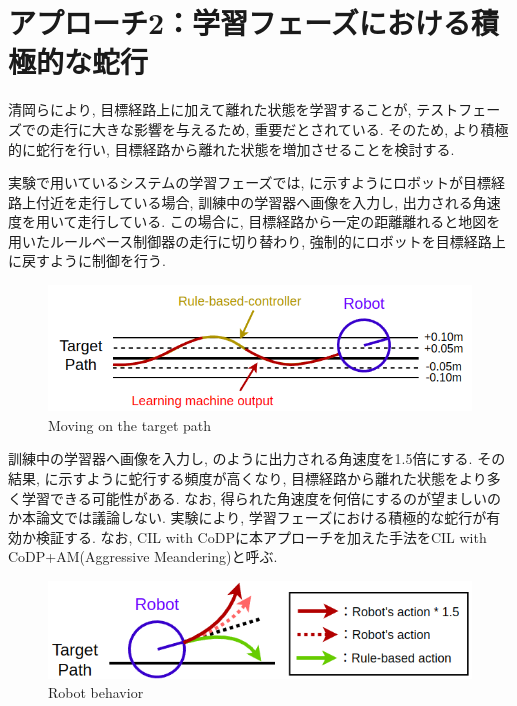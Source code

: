 
 

\newpage

\section{アプローチ2：学習フェーズにおける積極的な蛇行}
清岡ら\cite{kiyooka}により, 目標経路上に加えて離れた状態を学習することが, テストフェーズでの走行に大きな影響を与えるため, 重要だとされている. そのため, より積極的に蛇行を行い, 目標経路から離れた状態を増加させることを検討する. \par
実験で用いているシステムの学習フェーズでは,  に示すようにロボットが目標経路上付近を走行している場合, 訓練中の学習器へ画像を入力し, 出力される角速度を用いて走行している. この場合に, 目標経路から一定の距離離れると地図を用いたルールベース制御器の走行に切り替わり, 強制的にロボットを目標経路上に戻すように制御を行う. 

\begin{figure}[hbtp]
  \centering
 \includegraphics[keepaspectratio, scale=0.58]
      {images/act1.0.png}
 \caption{Moving on the target path}
 \label{Fig:act1.0}
\end{figure}

訓練中の学習器へ画像を入力し, のように出力される角速度を1.5倍にする. その結果, に示すように蛇行する頻度が高くなり, 目標経路から離れた状態をより多く学習できる可能性がある. なお, 得られた角速度を何倍にするのが望ましいのか本論文では議論しない. 実験により, 学習フェーズにおける積極的な蛇行が有効か検証する. なお, CIL with CoDPに本アプローチを加えた手法をCIL with CoDP+AM(Aggressive Meandering)と呼ぶ.

\begin{figure}[hbtp]
  \centering
 \includegraphics[keepaspectratio, scale=0.5]
      {images/3action3.png}
 \caption{Robot behavior}
 \label{Fig:3action}
\end{figure}

